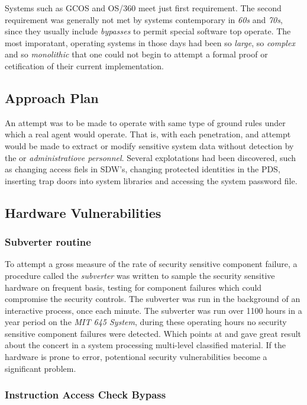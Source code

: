 Systems such as GCOS and OS/360 meet just first requirement. The second requirement was generally not met by
systems contemporary in \textit{60s} and \textit{70s}, since they usually include \textit{bypasses} to permit
special software top operate.
The most imporatant, operating systems in those days had been so \textit{large}, so \textit{complex} and 
so \textit{monolithic} that one could not begin to attempt a formal proof or cetification of their current 
implementation. 

\subsection{Approach Plan}

An attempt was to be made to operate with same type of ground rules under which a real agent would operate.
That is, with each penetration, and attempt would be made to extract or modify sensitive system data 
without detection by the  or \textit{administratiove personnel}.
Several explotations had been discovered, such as changing access fiels in SDW's, changing protected 
identities in the PDS, inserting trap doors into system libraries and accessing the system password file.

\subsection{Hardware Vulnerabilities}

\subsubsection{Subverter routine}

To attempt a gross measure of the rate of security sensitive component failure, a procedure called the 
\textit{subverter} was written to sample the security sensitive hardware on frequent basis, testing for 
component failures which could compromise the security controls.
The subverter was run in the background of an interactive process, once each minute. The subverter was run 
over 1100 hours in a year period on the \textit{MIT 645 System}, during these operating hours no security sensitive 
component failures were detected.
Which points at and gave great result about the concert in a system processing multi-level classified material.
If the hardware is prone to error, potentional security vulnerabilities become a significant problem.

\subsubsection{Instruction Access Check Bypass}

